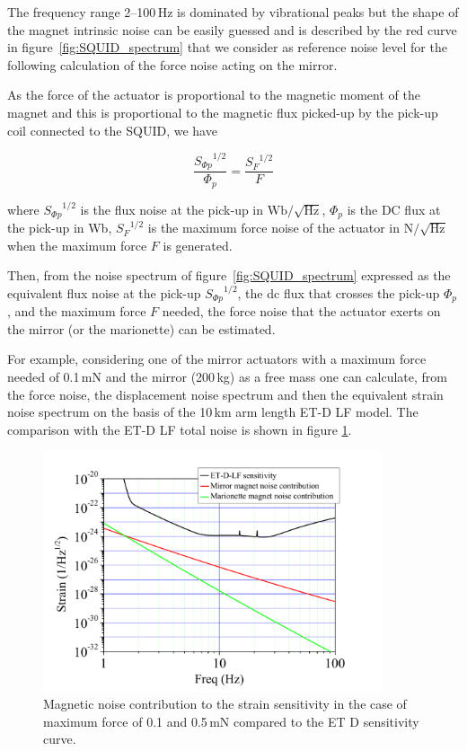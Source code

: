 The frequency range 2--100\,Hz is dominated by vibrational peaks but the shape of the magnet intrinsic noise can be easily guessed and is described by the red curve in figure~\ref{fig:SQUID_spectrum} that we consider as reference noise level for the following calculation of the force noise acting on the mirror. 

As the force of the actuator is proportional to the magnetic moment of the magnet and this is proportional to the magnetic flux picked-up by the pick-up coil connected to the SQUID, we have

\begin{equation}
\frac { {S_{\Phi p}}^ {1/2} } { \Phi_p } = \frac  {{S_{F}}^{1/2}} {F}	
\label{eq:Flux_1}
\end{equation}

\noindent
where ${{S_{\Phi p}}^ {1/2}}$ is the flux noise at the pick-up in $\mathrm{Wb/\sqrt{Hz}}$, $\Phi_p$ is the DC flux at the pick-up in Wb, ${S_F}^{1/2}$ is the maximum force noise of the actuator in $\mathrm{N/ \sqrt{Hz}}$ when the maximum force $F$ is generated.

Then, from the noise spectrum of figure~\ref{fig:SQUID_spectrum} expressed as the equivalent flux noise at the pick-up ${{S_{\Phi p}}^ {1/2}}$, the dc flux that crosses the pick-up $\Phi_p$, and the maximum force $F$ needed, the force noise that the actuator exerts on the mirror (or the marionette) can be estimated.

For example, considering one of the mirror actuators with a maximum force needed of 0.1\,mN and the mirror (200\,kg) as a free mass one can calculate, from the force noise, the displacement noise spectrum and then the equivalent strain noise spectrum on the basis of the 10\,km arm length ET-D LF model. The comparison with the ET-D LF total noise is shown in figure \ref{fig:actuator_magnetic_noise_contribution}.

\begin{figure}[htbp]
\begin{center}
\includegraphics[width=10cm]{Sec_Suspensions/Figures/actuator_magnetic_noise_contribution.pdf}
\caption{Magnetic noise contribution to the strain sensitivity in the case of maximum force of 0.1 and 0.5\,mN  compared to the ET D sensitivity curve.}
\label{fig:actuator_magnetic_noise_contribution}
\end{center}
\end{figure}

